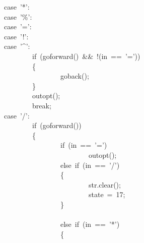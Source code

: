 \documentclass{article}
\begin{document}
\begin{mdpre}
~~~~~~~~~~~~~~~~~~~~~~~~~~~~~~~~{case}~{'*'}:\\
~~~~~~~~~~~~~~~~~~~~~~~~~~~~~~~~{case}~{'\%'}:\\
~~~~~~~~~~~~~~~~~~~~~~~~~~~~~~~~{case}~{'='}:\\
~~~~~~~~~~~~~~~~~~~~~~~~~~~~~~~~{case}~{'!'}:\\
~~~~~~~~~~~~~~~~~~~~~~~~~~~~~~~~{case}~{'\textasciicircum{}'}:\\
~~~~~~~~~~~~~~~~~~~~~~~~~~~~~~~~~~~~~~~~{if}~(goforward()~\&\&~!(in~==~{'='}))\\
~~~~~~~~~~~~~~~~~~~~~~~~~~~~~~~~~~~~~~~~\{\\
~~~~~~~~~~~~~~~~~~~~~~~~~~~~~~~~~~~~~~~~~~~~~~~~goback();\\
~~~~~~~~~~~~~~~~~~~~~~~~~~~~~~~~~~~~~~~~\}\\
~~~~~~~~~~~~~~~~~~~~~~~~~~~~~~~~~~~~~~~~outopt();\\
~~~~~~~~~~~~~~~~~~~~~~~~~~~~~~~~~~~~~~~~{break};\\
~~~~~~~~~~~~~~~~~~~~~~~~~~~~~~~~{case}~{'/'}:\\
~~~~~~~~~~~~~~~~~~~~~~~~~~~~~~~~~~~~~~~~{if}~(goforward())\\
~~~~~~~~~~~~~~~~~~~~~~~~~~~~~~~~~~~~~~~~\{\\
~~~~~~~~~~~~~~~~~~~~~~~~~~~~~~~~~~~~~~~~~~~~~~~~{if}~(in~==~{'='})\\
~~~~~~~~~~~~~~~~~~~~~~~~~~~~~~~~~~~~~~~~~~~~~~~~~~~~~~~~outopt();\\
~~~~~~~~~~~~~~~~~~~~~~~~~~~~~~~~~~~~~~~~~~~~~~~~{else}~{if}~(in~==~{'/'})\\
~~~~~~~~~~~~~~~~~~~~~~~~~~~~~~~~~~~~~~~~~~~~~~~~\{\\
~~~~~~~~~~~~~~~~~~~~~~~~~~~~~~~~~~~~~~~~~~~~~~~~~~~~~~~~str.clear();\\
~~~~~~~~~~~~~~~~~~~~~~~~~~~~~~~~~~~~~~~~~~~~~~~~~~~~~~~~state~=~{17};\\
~~~~~~~~~~~~~~~~~~~~~~~~~~~~~~~~~~~~~~~~~~~~~~~~\}\\
\\
~~~~~~~~~~~~~~~~~~~~~~~~~~~~~~~~~~~~~~~~~~~~~~~~{else}~{if}~(in~==~{'*'})\\
~~~~~~~~~~~~~~~~~~~~~~~~~~~~~~~~~~~~~~~~~~~~~~~~\{\\

\end{mdpre}
\end{document}

